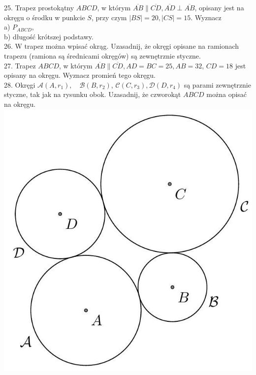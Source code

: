 \documentclass[10pt]{article}
\begin{document}
25. Trapez prostokątny \(A B C D\), w którym \(\overline{A B} \| \overline{C D}, \overline{A D} \perp \overline{A B}\), opisany jest na okręgu o środku w punkcie \(S\), przy czym \(|B S|=20,|C S|=15\). Wyznacz\\
a) \(P_{A B C D}\),\\
b) długość krótszej podstawy.\\
26. W trapez można wpisać okrąg. Uzasadnij, że okręgi opisane na ramionach trapezu (ramiona są średnicami okręgów) są zewnętrznie styczne.\\
27. Trapez \(A B C D\), w którym \(\overline{A B} \| \overline{C D}, A D=B C=25, A B=32\), \(C D=18\) jest opisany na okręgu. Wyznacz promień tego okręgu.\\
28. Okręgi \(\mathcal{A}\left(A, r_{1}\right), \quad \mathcal{B}\left(B, r_{2}\right)\), \(\mathcal{C}\left(C, r_{3}\right), \mathcal{D}\left(D, r_{4}\right)\) są parami zewnętrznie styczne, tak jak na rysunku obok. Uzasadnij, że czworokąt \(A B C D\) można opisać na okręgu.\\
\includegraphics[max width=\textwidth, center]{2024_11_21_e9b4faa005d5be2cc318g-053(1)}
\end{document}
